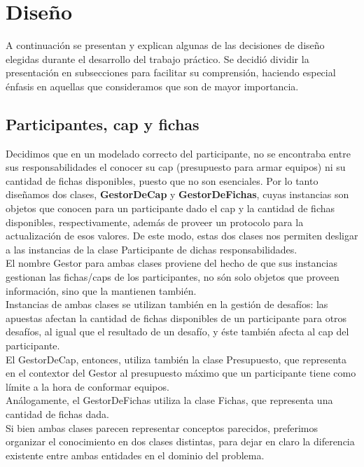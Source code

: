 \section{Diseño}
A continuación se presentan y explican algunas de las decisiones de diseño elegidas durante el desarrollo del trabajo práctico.
Se decidió dividir la presentación en subsecciones para facilitar su comprensión, haciendo especial énfasis en aquellas que consideramos que son de mayor importancia.



\subsection{Participantes, cap y fichas}
Decidimos que en un modelado correcto del participante, no se encontraba entre sus responsabilidades el conocer su cap (presupuesto para armar equipos) ni su cantidad de fichas disponibles, puesto que no son esenciales. Por lo tanto diseñamos dos clases, \textbf{GestorDeCap} y \textbf{GestorDeFichas}, cuyas instancias son objetos que conocen para un participante dado el cap y la cantidad de fichas disponibles, respectivamente, además de proveer un protocolo para la actualización de esos valores. De este modo, estas dos clases nos permiten desligar a las instancias de la clase Participante de dichas responsabilidades.\\
El nombre Gestor para ambas clases proviene del hecho de que sus instancias gestionan las fichas/caps de los participantes, no són solo objetos que proveen información, sino que la mantienen también.\\
Instancias de ambas clases se utilizan también en la gestión de desafíos: las apuestas afectan la cantidad de fichas disponibles de un participante para otros desafíos, al igual que el resultado de un desafío, y éste también afecta al cap del participante.\\
El GestorDeCap, entonces, utiliza también la clase Presupuesto, que representa en el contextor del Gestor al presupuesto máximo que un participante tiene como límite a la hora de conformar equipos.\\
Análogamente, el GestorDeFichas utiliza la clase Fichas, que representa una cantidad de fichas dada.\\
Si bien ambas clases parecen representar conceptos parecidos, preferimos organizar el conocimiento en dos clases distintas, para dejar en claro la diferencia existente entre ambas entidades en el dominio del problema.\\

